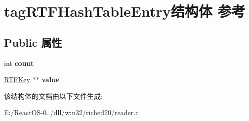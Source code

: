 \hypertarget{structtag_r_t_f_hash_table_entry}{}\section{tag\+R\+T\+F\+Hash\+Table\+Entry结构体 参考}
\label{structtag_r_t_f_hash_table_entry}
\subsection*{Public 属性}
\begin{DoxyCompactItemize}
\item 
\mbox{\label{structtag_r_t_f_hash_table_entry_a02b89886c1eb77ff1c122a7a9c02f484}} 
int {\bfseries count}
\item 
\mbox{\label{structtag_r_t_f_hash_table_entry_a6b4a251c382a434279f8e5f6e20fc75d}} 
\hyperlink{struct_r_t_f_key}{R\+T\+F\+Key} $\ast$$\ast$ {\bfseries value}
\end{DoxyCompactItemize}


该结构体的文档由以下文件生成\+:\begin{DoxyCompactItemize}
\item 
E\+:/\+React\+O\+S-\/0../dll/win32/riched20/reader.\+c\end{DoxyCompactItemize}
